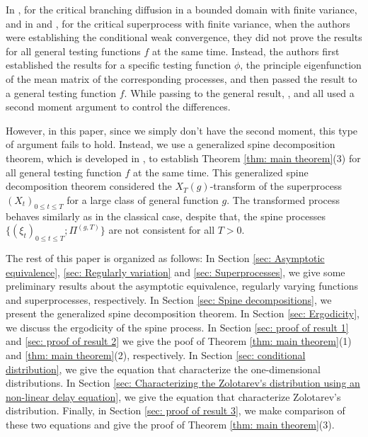 \documentclass[12pt, a4paper]{amsart}
\theoremstyle{definition}
\numberwithin{equation}{section}
\begin{document}
	In \cite{Powell2015An-invariance}, for the critical branching diffusion in a bounded domain with finite variance, and in \cite{RenSongSun2017Spine} and
	\cite{RenSongZhang2015Limit}, for the critical superprocess with finite variance, when the authors were establishing the conditional weak convergence, they did not prove the results for all general testing functions $f$ at the same time.
	Instead, the authors first established the results for a specific testing function $\phi$, the principle eigenfunction of the mean matrix of the corresponding processes, and then passed the result to a general testing function $f$.
	While passing to the general result, \cite{Powell2015An-invariance}, \cite{RenSongZhang2015Limit} and \cite{RenSongSun2017Spine} all used a second moment argument to control the differences.
	
	However, in this paper, since we simply don't have the second moment, this type of argument fails to hold.
	Instead, we use a generalized spine decomposition theorem, which is developed in \cite{RenSongSun2017Spine}, to establish Theorem \ref{thm: main theorem}(3) for all general testing function $f$ at the same time.
	This generalized spine decomposition theorem considered the $X_T(g)$-transform of the superprocess $(X_t)_{0\leq t\leq T}$ for a large class of general function $g$.
	The transformed process behaves similarly as in the classical case, despite that, the spine processes $\{(\xi_t)_{0\leq t\leq T}; \Pi^{(g,T)}\}$ 
	are not consistent for all $T>0$.
	
	The rest of this paper is organized as follows:
	In Section \ref{sec: Asymptotic equivalence}, \ref{sec: Regularly variation} and \ref{sec: Superprocesses}, we give some preliminary results about the asymptotic equivalence, regularly varying functions and superprocesses, respectively.
	In Section \ref{sec: Spine decompositions}, we present the generalized spine decomposition theorem.
	In Section \ref{sec: Ergodicity}, we discuss the ergodicity of the spine process.
	In Section \ref{sec: proof of result 1} and \ref{sec: proof of result 2} we give the poof of Theorem \ref{thm: main theorem}(1) and \ref{thm: main theorem}(2), respectively.
	In Section \ref{sec: conditional distribution}, we give the equation that characterize the one-dimensional distributions.
	In Section \ref{sec: Characterizing the Zolotarev's distribution using an non-linear delay equation}, we give the equation that characterize Zolotarev's distribution.
	Finally, in Section \ref{sec: proof of result 3}, we make comparison of these two equations and give the proof of Theorem \ref{thm: main theorem}(3).
\end{document}
